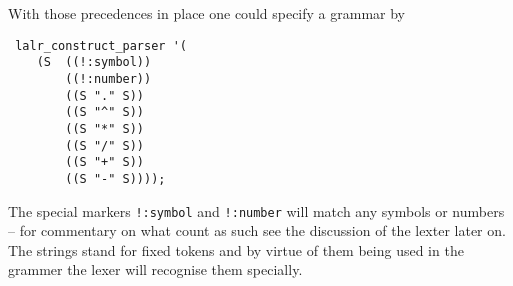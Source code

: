 \documentclass[12pt]{article}
\begin{document}
With those precedences in place one could specify a grammar by
\begin{verbatim}
 lalr_construct_parser '(
    (S  ((!:symbol))
        ((!:number))
        ((S "." S))
        ((S "^" S))
        ((S "*" S))
        ((S "/" S))
        ((S "+" S))
        ((S "-" S))));
\end{verbatim}

The special markers \verb+!:symbol+ and \verb+!:number+ will match any
symbols or numbers -- for commentary on what count as such see the discussion
of the lexter later on. The strings stand for fixed tokens and by virtue
of them being used in the grammer the lexer will recognise them specially.
\end{document}
